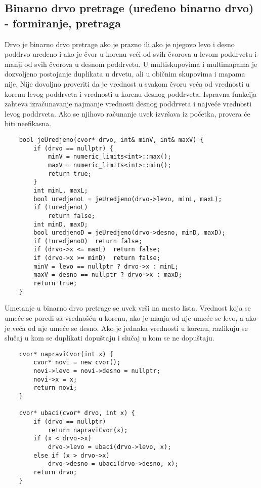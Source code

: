 \documentclass{article}
\begin{document}
\subsection{Binarno drvo pretrage (uređeno binarno drvo) - formiranje, pretraga}
Drvo je binarno drvo pretrage ako je prazno ili ako je njegovo levo i desno
poddrvo uređeno i ako je čvor u korenu veći od svih čvorova u levom poddrvetu
i manji od svih čvorova u desnom poddrvetu. U multiskupovima i multimapama
je dozvoljeno postojanje duplikata u drvetu, ali u običnim skupovima i mapama
nije. 
\newline Nije dovoljno proveriti da je vrednost u svakom čvoru veća od
vrednosti u korenu levog poddrveta i vrednosti u korenu desnog poddrveta. Ispravna funkcija zahteva izračunavanje najmanje vrednosti desnog poddrveta i najveće vrednosti levog poddrveta. Ako se njihovo računanje uvek izvršava iz početka, provera će biti neefikasna. 
\begin{lstlisting}
    bool jeUredjeno(cvor* drvo, int& minV, int& maxV) {
        if (drvo == nullptr) {
            minV = numeric_limits<int>::max();
            maxV = numeric_limits<int>::min();
            return true;
        }
        int minL, maxL;
        bool uredjenoL = jeUredjeno(drvo->levo, minL, maxL);
        if (!uredjenoL) 
            return false;
        int minD, maxD;
        bool uredjenoD = jeUredjeno(drvo->desno, minD, maxD);
        if (!uredjenoD)  return false;
        if (drvo->x <= maxL)  return false;
        if (drvo->x >= minD)  return false;
        minV = levo == nullptr ? drvo->x : minL;
        maxV = desno == nullptr ? drvo->x : maxD;
        return true;
    }
\end{lstlisting}
Umetanje u binarno drvo pretrage se uvek vrši na mesto lista. Vrednost koja se umeće se poredi sa vrednošću u korenu, ako je manja od nje umeće se levo, a
ako je veća od nje umeće se desno. Ako je jednaka vrednosti u korenu, razlikuju
se slučaj u kom se duplikati dopuštaju i slučaj u kom se ne dopuštaju.
\begin{lstlisting}
    cvor* napraviCvor(int x) {
        cvor* novi = new cvor();
        novi->levo = novi->desno = nullptr;
        novi->x = x;
        return novi;
    }
    
    cvor* ubaci(cvor* drvo, int x) {
        if (drvo == nullptr)
            return napraviCvor(x);
        if (x < drvo->x)
            drvo->levo = ubaci(drvo->levo, x);
        else if (x > drvo->x)
            drvo->desno = ubaci(drvo->desno, x);
        return drvo;
    }
\end{lstlisting}
\end{document}
